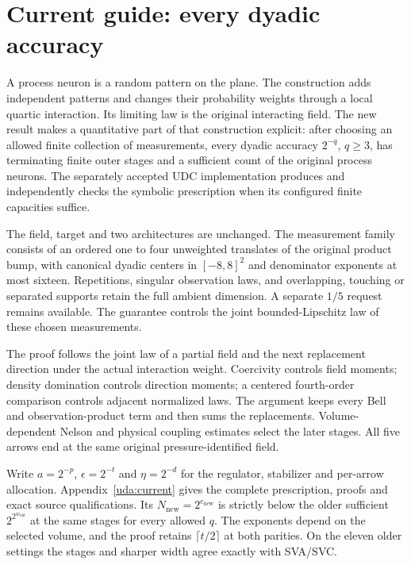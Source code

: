 \clearpage
\section*{Current guide: every dyadic accuracy}
\label{uda:guide}
A process neuron is a random pattern on the plane. The construction adds
independent patterns and changes their probability weights through a local
quartic interaction. Its limiting law is the original interacting field.
The new result makes a quantitative part of that construction explicit:
after choosing an allowed finite collection of measurements, every dyadic
accuracy $2^{-q}$, $q\ge3$, has terminating finite outer stages and a
sufficient count of the original process neurons. The separately accepted
UDC implementation produces and independently checks the symbolic prescription
when its configured finite capacities suffice.

The field, target and two architectures are unchanged. The measurement
family consists of an ordered one to four unweighted translates of the
original product bump, with canonical dyadic centers in $[-8,8]^2$ and
denominator exponents at most sixteen. Repetitions, singular observation
laws, and overlapping, touching or separated supports retain the full
ambient dimension. A separate $1/5$ request remains available. The guarantee
controls the joint bounded-Lipschitz law of these chosen measurements.

The proof follows the joint law of a partial field and the next replacement
direction under the actual interaction weight. Coercivity controls field
moments; density domination controls direction moments; a centered fourth-order
comparison controls adjacent normalized laws. The argument keeps every Bell
and observation-product term and then sums the replacements. Volume-dependent
Nelson and physical coupling estimates select the later stages. All five
arrows end at the same original pressure-identified field.

Write $a=2^{-p}$, $\epsilon=2^{-t}$ and $\eta=2^{-d}$ for the regulator,
stabilizer and per-arrow allocation. Appendix~\ref{uda:current} gives
the complete prescription, proofs and exact source qualifications. Its
$N_{\mathrm{new}}=2^{e_{\mathrm{new}}}$ is strictly below the older sufficient
$2^{2^{w_{\mathrm{old}}}}$ at the same stages for every allowed $q$.
The exponents depend on the selected volume, and the proof retains
$\lceil t/2\rceil$ at both parities. On the eleven older settings the
stages and sharper width agree exactly with SVA/SVC.

